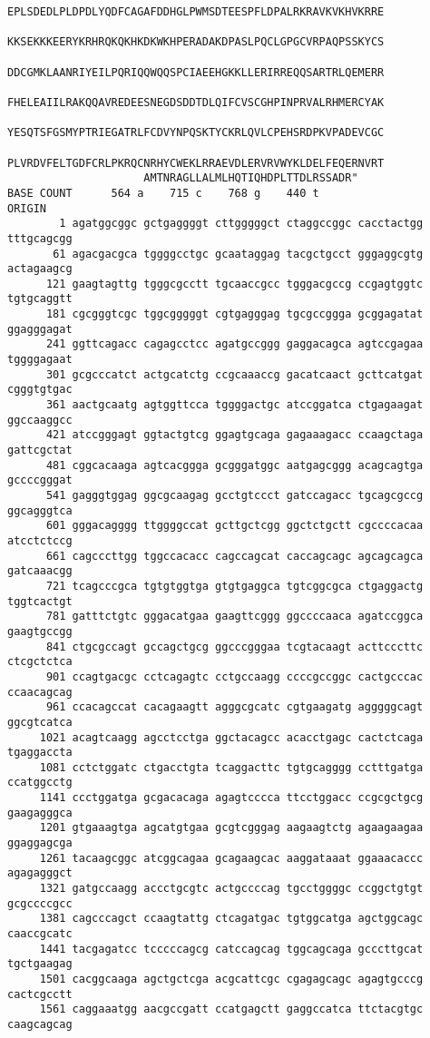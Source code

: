 \begin{lstlisting}[language={},basicstyle=\small\tt,breaklines=false]
                     EPLSDEDLPLDPDLYQDFCAGAFDDHGLPWMSDTEESPFLDPALRKRAVKVKHVKRRE
                     KKSEKKKEERYKRHRQKQKHKDKWKHPERADAKDPASLPQCLGPGCVRPAQPSSKYCS
                     DDCGMKLAANRIYEILPQRIQQWQQSPCIAEEHGKKLLERIRREQQSARTRLQEMERR
                     FHELEAIILRAKQQAVREDEESNEGDSDDTDLQIFCVSCGHPINPRVALRHMERCYAK
                     YESQTSFGSMYPTRIEGATRLFCDVYNPQSKTYCKRLQVLCPEHSRDPKVPADEVCGC
                     PLVRDVFELTGDFCRLPKRQCNRHYCWEKLRRAEVDLERVRVWYKLDELFEQERNVRT
                     AMTNRAGLLALMLHQTIQHDPLTTDLRSSADR"
BASE COUNT      564 a    715 c    768 g    440 t
ORIGIN      
        1 agatggcggc gctgaggggt cttgggggct ctaggccggc cacctactgg tttgcagcgg
       61 agacgacgca tggggcctgc gcaataggag tacgctgcct gggaggcgtg actagaagcg
      121 gaagtagttg tgggcgcctt tgcaaccgcc tgggacgccg ccgagtggtc tgtgcaggtt
      181 cgcgggtcgc tggcgggggt cgtgagggag tgcgccggga gcggagatat ggagggagat
      241 ggttcagacc cagagcctcc agatgccggg gaggacagca agtccgagaa tggggagaat
      301 gcgcccatct actgcatctg ccgcaaaccg gacatcaact gcttcatgat cgggtgtgac
      361 aactgcaatg agtggttcca tggggactgc atccggatca ctgagaagat ggccaaggcc
      421 atccgggagt ggtactgtcg ggagtgcaga gagaaagacc ccaagctaga gattcgctat
      481 cggcacaaga agtcacggga gcgggatggc aatgagcggg acagcagtga gccccgggat
      541 gagggtggag ggcgcaagag gcctgtccct gatccagacc tgcagcgccg ggcagggtca
      601 gggacagggg ttggggccat gcttgctcgg ggctctgctt cgccccacaa atcctctccg
      661 cagcccttgg tggccacacc cagccagcat caccagcagc agcagcagca gatcaaacgg
      721 tcagcccgca tgtgtggtga gtgtgaggca tgtcggcgca ctgaggactg tggtcactgt
      781 gatttctgtc gggacatgaa gaagttcggg ggccccaaca agatccggca gaagtgccgg
      841 ctgcgccagt gccagctgcg ggcccgggaa tcgtacaagt acttcccttc ctcgctctca
      901 ccagtgacgc cctcagagtc cctgccaagg ccccgccggc cactgcccac ccaacagcag
      961 ccacagccat cacagaagtt agggcgcatc cgtgaagatg agggggcagt ggcgtcatca
     1021 acagtcaagg agcctcctga ggctacagcc acacctgagc cactctcaga tgaggaccta
     1081 cctctggatc ctgacctgta tcaggacttc tgtgcagggg cctttgatga ccatggcctg
     1141 ccctggatga gcgacacaga agagtcccca ttcctggacc ccgcgctgcg gaagagggca
     1201 gtgaaagtga agcatgtgaa gcgtcgggag aagaagtctg agaagaagaa ggaggagcga
     1261 tacaagcggc atcggcagaa gcagaagcac aaggataaat ggaaacaccc agagagggct
     1321 gatgccaagg accctgcgtc actgccccag tgcctggggc ccggctgtgt gcgccccgcc
     1381 cagcccagct ccaagtattg ctcagatgac tgtggcatga agctggcagc caaccgcatc
     1441 tacgagatcc tcccccagcg catccagcag tggcagcaga gcccttgcat tgctgaagag
     1501 cacggcaaga agctgctcga acgcattcgc cgagagcagc agagtgcccg cactcgcctt
     1561 caggaaatgg aacgccgatt ccatgagctt gaggccatca ttctacgtgc caagcagcag

\end{lstlisting}
